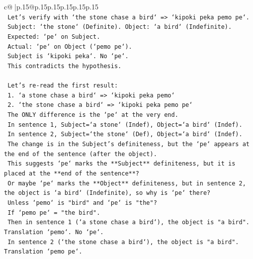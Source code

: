\documentclass{article}
\begin{document}
{\begin{supertabular}{c@{$\;$}|p{.15\linewidth}@{}p{.15\linewidth}p{.15\linewidth}p{.15\linewidth}p{.15\linewidth}p{.15\linewidth}}
{{{\\ 
\texttt{                    Let's verify with `the stone chase a bird` => `kipoki peka pemo pe`.} \\
\texttt{                    Subject: `the stone` (Definite). Object: `a bird` (Indefinite).} \\
\texttt{                    Expected: `pe` on Subject.} \\
\texttt{                    Actual: `pe` on Object (`pemo pe`).} \\
\texttt{                    Subject is `kipoki peka`. No `pe`.} \\
\texttt{                    This contradicts the hypothesis.} \\
\\ 
\texttt{                    Let's re{-}read the first result:} \\
\texttt{                    1. `a stone chase a bird` => `kipoki peka pemo`} \\
\texttt{                    2. `the stone chase a bird` => `kipoki peka pemo pe`} \\
\texttt{                    The ONLY difference is the `pe` at the very end.} \\
\texttt{                    In sentence 1, Subject=`a stone` (Indef), Object=`a bird` (Indef).} \\
\texttt{                    In sentence 2, Subject=`the stone` (Def), Object=`a bird` (Indef).} \\
\texttt{                    The change is in the Subject's definiteness, but the `pe` appears at the end of the sentence (after the object).} \\
\texttt{                    This suggests `pe` marks the **Subject** definiteness, but it is placed at the **end of the sentence**?} \\
\texttt{                    Or maybe `pe` marks the **Object** definiteness, but in sentence 2, the object is `a bird` (Indefinite), so why is `pe` there?} \\
\texttt{                    Unless `pemo` is "bird" and `pe` is "the"?} \\
\texttt{                    If `pemo pe` = "the bird".} \\
\texttt{                    Then in sentence 1 (`a stone chase a bird`), the object is "a bird". Translation `pemo`. No `pe`.} \\
\texttt{                    In sentence 2 (`the stone chase a bird`), the object is "a bird". Translation `pemo pe`.} \\
}}}
\end{supertabular}}
\end{document}
